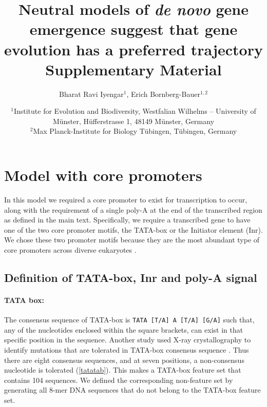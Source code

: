 \documentclass[12pt,a4paper]{article}
\title{{\Large Neutral models of \textit{de novo} gene emergence suggest that gene evolution has a preferred trajectory}\\ Supplementary Material}
\author{Bharat Ravi Iyengar$^1$, Erich Bornberg-Bauer$^{1,2}$}
\date{\small $^1$Institute for Evolution and Biodiversity, Westfalian Wilhelms -- University of M\"{u}nster, H\"{u}fferstrasse 1, 48149 M\"{u}nster, Germany\\ $^2$Max Planck-Institute for Biology T\"{u}bingen, T\"{u}bingen, Germany}
\begin{document}
\onehalfspacing

\setlength{\abovedisplayskip}{0pt}
\setlength{\belowdisplayskip}{1em}

\maketitle

\section{Model with core promoters}

In this model we required a core promoter to exist for transcription to occur, along with the requirement of a single poly-A at the end of the transcribed region as defined in the main text. Specifically, we require a transcribed gene to have one of the two core promoter motifs, the TATA-box or the Initiator element (Inr). We chose these two promoter motifs because they are the most abundant type of core promoters across diverse eukaryotes \citep{Promoters,corepromoters}.


\subsection{Definition of TATA-box, Inr and poly-A signal}

\paragraph{TATA box:}

The consensus sequence of TATA-box is \texttt{TATA [T/A] A [T/A] [G/A]} \citep{tata2} such that, any of the nucleotides enclosed within the square brackets, can exist in that specific position in the sequence. Another study used X-ray crystallography to identify mutations that are tolerated in TATA-box consensus sequence \citep{tata1}. Thus there are eight consensus sequences, and at seven positions, a non-consensus nucleotide is tolerated (\autoref{tatatab}). This makes a TATA-box feature set that contains 104 sequences. We defined the corresponding non-feature set by generating all 8-mer DNA sequences that do not belong to the TATA-box feature set.
\end{document}
